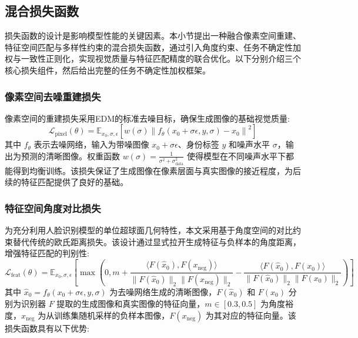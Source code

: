 \subsection{混合损失函数}
\label{sec:tia_loss}

损失函数的设计是影响模型性能的关键因素。本小节提出一种融合像素空间重建、特征空间匹配与多样性约束的混合损失函数，通过引入角度约束、任务不确定性加权与一致性正则化，实现视觉质量与特征匹配精度的联合优化。以下分别介绍三个核心损失组件，然后给出完整的任务不确定性加权框架。

\subsubsection{像素空间去噪重建损失}

像素空间的重建损失采用EDM的标准去噪目标，确保生成图像的基础视觉质量:
\begin{equation}\label{eq:tia_pixel_loss}
  \mathcal{L}_{\text{pixel}}(\theta) = \mathbb{E}_{x_0, \sigma, \epsilon} \left[ w(\sigma) \left\| f_\theta(x_0 + \sigma \epsilon, y, \sigma) - x_0 \right\|^2 \right]
\end{equation}
其中 $f_\theta$ 表示去噪网络，输入为带噪图像 $x_0 + \sigma \epsilon$、身份标签 $y$ 和噪声水平 $\sigma$，输出为预测的清晰图像。权重函数 $w(\sigma) = \frac{1}{\sigma^2 + \sigma_{\text{data}}^2}$ 使得模型在不同噪声水平下都能得到均衡训练。该损失保证了生成图像在像素层面与真实图像的接近程度，为后续的特征匹配提供了良好的基础。

\subsubsection{特征空间角度对比损失}

为充分利用人脸识别模型的单位超球面几何特性，本文采用基于角度空间的对比约束替代传统的欧氏距离损失。该设计通过显式拉开生成特征与负样本的角度距离，增强特征匹配的判别性:
\begin{equation}\label{eq:tia_feat_loss}
    \mathcal{L}_{\text{feat}}(\theta) = \mathbb{E}_{x_0, \sigma, \epsilon} \left[ \max\left(0, m + \frac{\langle F(\hat{x}_0), F(x_{\text{neg}}) \rangle}{\|F(\hat{x}_0)\|_2 \|F(x_{\text{neg}})\|_2} - \frac{\langle F(\hat{x}_0), F(x_0) \rangle}{\|F(\hat{x}_0)\|_2 \|F(x_0)\|_2}\right) \right]
\end{equation}
其中 $\hat{x}_0 = f_\theta(x_0 + \sigma \epsilon, y, \sigma)$ 为去噪网络生成的清晰图像，$F(\hat{x}_0)$ 和 $F(x_0)$ 分别为识别器 $F$ 提取的生成图像和真实图像的特征向量，$m \in [0.3, 0.5]$ 为角度裕度，$x_{\text{neg}}$ 为从训练集随机采样的负样本图像，$F(x_{\text{neg}})$ 为其对应的特征向量。该损失函数具有以下优势:

